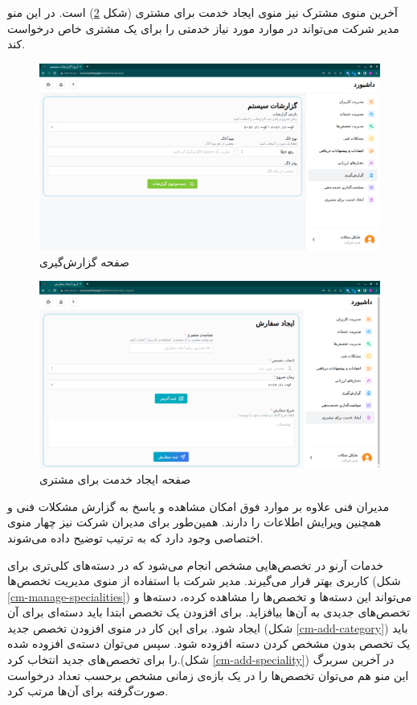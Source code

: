 آخرین منوی مشترک نیز منوی ایجاد خدمت برای مشتری (شکل \ref{create-request-for-user}) است.
در این منو مدیر شرکت می‌تواند در موارد مورد نیاز خدمتی را برای یک مشتری خاص درخواست کند.

\begin{figure}[h]
	\centering
	\includegraphics[width=\textwidth]{figs/user-guide/cm-report}
	\caption{صفحه گزارش‌گیری}
	\label{system-report}
\end{figure}

\begin{figure}[h]
	\centering
	\includegraphics[width=\textwidth]{figs/user-guide/cm-create-request}
	\caption{صفحه ایجاد خدمت برای مشتری}
	\label{create-request-for-user}
\end{figure}

\FloatBarrier

مدیران فنی علاوه بر موارد فوق امکان مشاهده و پاسخ به گزارش مشکلات فنی و همچنین ویرایش اطلاعات را دارند.
همین‌طور برای مدیران شرکت نیز چهار منوی اختصاصی وجود دارد که به ترتیب توضیح داده می‌شوند.

خدمات آرنو در تخصص‌هایی مشخص انجام می‌شود که در دسته‌های کلی‌تری برای کاربری بهتر قرار می‌گیرند.
مدیر شرکت با استفاده از منوی مدیریت تخصص‌ها (شکل \ref{cm-manage-specialities})  می‌تواند این دسته‌ها و تخصص‌ها را مشاهده کرده، دسته‌ها و تخصص‌های جدیدی به آن‌ها بیافزاید.
برای افزودن یک تخصص ابتدا باید دسته‌ای برای آن ایجاد شود. برای این کار در منوی افزودن تخصص جدید (شکل \ref{cm-add-category}) باید یک تخصص بدون مشخص کردن دسته افزوده شود.
سپس می‌توان دسته‌ی افزوده شده را برای تخصص‌های جدید انتخاب کرد.(شکل \ref{cm-add-speciality})
در آخرین سربرگ این منو هم می‌توان تخصص‌ها را در یک بازه‌ی زمانی مشخص برحسب تعداد درخواست صورت‌گرفته برای آن‌ها مرتب کرد.

